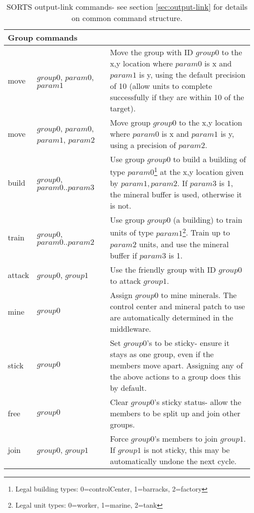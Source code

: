 \begin{center}
\begin{table}[h]
\begin{minipage}{6.5in}
\begin{tabular}{|l|p{1.0in}|p{3.5in}|}
\hline
\multicolumn{3}{|l|}{\textbf{Group commands}}\\
\hline
move & $group0$, $param0$, $param1$ & Move the group with ID $group0$ to the x,y location where $param0$ is x and $param1$ is y, using the default precision of 10 (allow units to complete successfully if they are within 10 of the target).\\
\hline
move & $group0$, $param0$, $param1$, $param2$ & Move group $group0$ to the x,y location where $param0$ is x and $param1$ is y, using a precision of $param2$.\\
\hline
build & $group0$, $param0 .. param3$ & Use group $group0$ to build a building of type $param0$\footnote{Legal building types: 0=controlCenter, 1=barracks, 2=factory} at the x,y location given by $param1, param2$. If $param3$ is 1, the mineral buffer is used, otherwise it is not. \\
\hline
train & $group0$, $param0 .. param2$ & Use group $group0$ (a building) to train units of type $param1$\footnote{Legal unit types: 0=worker, 1=marine, 2=tank}. Train up to $param2$ units, and use the mineral buffer if $param3$ is 1. \\
\hline
attack & $group0$, $group1$ & Use the friendly group with ID $group0$ to attack $group1$.\\
\hline
mine & $group0$ & Assign $group0$ to mine minerals. The control center and mineral patch to use are automatically determined in the middleware. \\
\hline
stick & $group0$ & Set $group0$'s to be sticky- ensure it stays as one group, even if the members move apart. Assigning any of the above actions to a group does this by default. \\
\hline
free & $group0$ & Clear $group0$'s sticky status- allow the members to be split up and join other groups.\\
\hline
join &  $group0$, $group1$ & Force $group0$'s members to join $group1$. If $group1$ is not sticky, this may be automatically undone the next cycle.\\
\hline
\end{tabular}
\end{minipage}
\caption{SORTS output-link commands- see section \ref{sec:output-link} for details on common command structure.}
\label{tb:commands}
\end{table}
\end{center}
